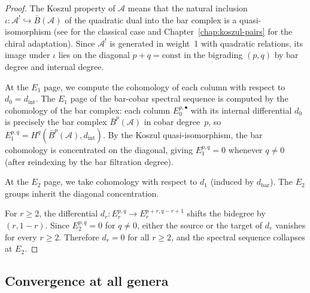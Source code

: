 \begin{proof}
The Koszul property of $\mathcal{A}$ means that the natural inclusion $\iota: \mathcal{A}^! \hookrightarrow \bar{B}(\mathcal{A})$ of the quadratic dual into the bar complex is a quasi-isomorphism (see \cite[Theorem~3.4.1]{LodayVallette} for the classical case and Chapter~\ref{chap:koszul-pairs} for the chiral adaptation). Since $\mathcal{A}^!$ is generated in weight~1 with quadratic relations, its image under $\iota$ lies on the diagonal $p + q = \text{const}$ in the bigrading $(p,q)$ by bar degree and internal degree.

At the $E_1$ page, we compute the cohomology of each column with respect to $d_0 = d_{\text{int}}$. The $E_1$ page of the bar-cobar spectral sequence is computed by the cohomology of the bar complex: each column $E_0^{p,\bullet}$ with its internal differential $d_0$ is precisely the bar complex $\bar{B}^p(\mathcal{A})$ in cobar degree~$p$, so $E_1^{p,q} = H^q(\bar{B}^p(\mathcal{A}), d_{\mathrm{int}})$. By the Koszul quasi-isomorphism, the bar cohomology is concentrated on the diagonal, giving $E_1^{p,q} = 0$ whenever $q \neq 0$ (after reindexing by the bar filtration degree).

At the $E_2$ page, we take cohomology with respect to $d_1$ (induced by $d_{\text{bar}}$). The $E_2$ groups inherit the diagonal concentration.

For $r \geq 2$, the differential $d_r: E_r^{p,q} \to E_r^{p+r, q-r+1}$ shifts the bidegree by $(r, 1-r)$. Since $E_2^{p,q} = 0$ for $q \neq 0$, either the source or the target of $d_r$ vanishes for every $r \geq 2$. Therefore $d_r = 0$ for all $r \geq 2$, and the spectral sequence collapses at $E_2$.
\end{proof}

\subsection{Convergence at all genera}

